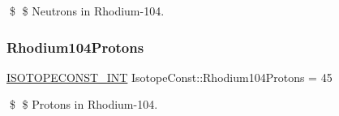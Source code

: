 \$ \$ Neutrons in Rhodium-\/104. \mbox{\label{group___isotope_const-_rhodium-_rh104_ga0627079e6a2071db783dba5bab1c3def}} 
\subsubsection{\texorpdfstring{Rhodium104\+Protons}{Rhodium104Protons}}
{\footnotesize\ttfamily \mbox{\hyperlink{group___isotope_const-_macros_ga5f18360b3e99483a35c32d789e62621c}{I\+S\+O\+T\+O\+P\+E\+C\+O\+N\+S\+T\+\_\+\+I\+NT}} Isotope\+Const\+::\+Rhodium104\+Protons = 45}

\$ \$ Protons in Rhodium-\/104. 